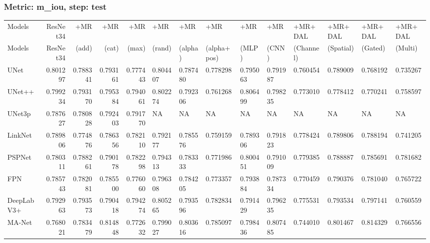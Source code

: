 \documentclass{article}
\begin{document}
\subsubsection{Metric: m\_iou, step: test}
\begin{tabular}{lrrrrlllllllll}
\toprule
Models & ResNet34 & +MR  & +MR  & +MR  & +MR  & +MR  & +MR  & +MR  & +MR  & +MR+DAL & +MR+DAL & +MR+DAL & +MR+DAL \\
Models & ResNet34 &  (add) &  (cat) &  (max) &  (rand) &  (alpha) &  (alpha+pos) &  (MLP) &  (CNN) & (Channel) & (Spatial) & (Gated) & (Multi) \\
\midrule
UNet & 0.801297 & 0.788341 & 0.793161 & 0.777443 & 0.804407 & 0.787480 & 0.778298 & 0.795063 & 0.791987 & 0.760454 & 0.789009 & 0.768192 & 0.735267 \\
UNet++ & 0.799234 & 0.793170 & 0.795384 & 0.794061 & 0.802274 & 0.792306 & 0.761268 & 0.806499 & 0.798235 & 0.773010 & 0.778412 & 0.770241 & 0.758597 \\
UNet3p & 0.787627 & 0.780828 & 0.792403 & 0.791770 & NA & NA & NA & NA & NA & NA & NA & NA & NA \\
LinkNet & 0.789806 & 0.774876 & 0.786356 & 0.782110 & 0.792177 & 0.785576 & 0.759159 & 0.789306 & 0.791823 & 0.778424 & 0.789806 & 0.788194 & 0.741205 \\
PSPNet & 0.780311 & 0.788261 & 0.790178 & 0.782298 & 0.794313 & 0.783333 & 0.771986 & 0.800451 & 0.791009 & 0.779385 & 0.788887 & 0.785691 & 0.781682 \\
FPN & 0.785743 & 0.782081 & 0.785500 & 0.776060 & 0.796308 & 0.784205 & 0.773357 & 0.793884 & 0.787334 & 0.770459 & 0.790376 & 0.781040 & 0.765722 \\
DeepLabV3+ & 0.792963 & 0.793573 & 0.790418 & 0.794274 & 0.805265 & 0.793596 & 0.782834 & 0.791429 & 0.796235 & 0.775531 & 0.793534 & 0.797141 & 0.760559 \\
MA-Net & 0.768021 & 0.783479 & 0.814848 & 0.772632 & 0.799027 & 0.803616 & 0.785097 & 0.798436 & 0.807485 & 0.744010 & 0.801467 & 0.814329 & 0.766556 \\
\bottomrule
\end{tabular}
\end{document}
